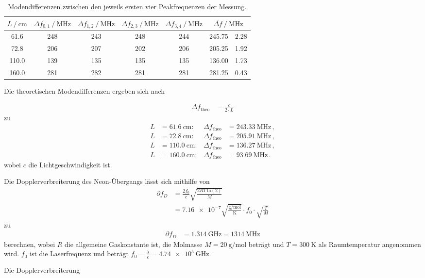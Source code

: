 \begin{table}[H]
  \centering
  \caption{Modendifferenzen zwischen den jeweils ersten vier Peakfrequenzen der Messung.}
  \label{tab:Modendifferenzen}
  \begin{tabular}{S[table-format=2.1] S S S S S@{${}\pm{}$} S[table-format=3.2]}
    \toprule
    {$L \mathbin{/} \si{\centi\meter}$} &{$\Delta f_{0,1} \mathbin{/} \si{\mega\hertz}$} &
    {$\Delta f_{1,2} \mathbin{/} \si{\mega\hertz}$} &{$\Delta f_{2,3} \mathbin{/} \si{\mega\hertz}$} &
    {$\Delta f_{3,4} \mathbin{/} \si{\mega\hertz}$} & \\
      & 248 & 243 & 248 & 244 & 245.75 & 2.28\\
       72.8  & 206 & 207 & 202 & 206 & 205.25 & 1.92\\
      110.0  & 139 & 135 & 135 & 135 & 136.00 & 1.73\\
      160.0  & 281 & 282 & 281 & 281 & 281.25 & 0.43\\
    \bottomrule
  \end{tabular}
\end{table}

Die theoretischen Modendifferenzen ergeben sich nach

\begin{align*}
  \Delta f_{\text{theo}} &= \frac{c}{2 \cdot L}
\end{align*}
zu 
\begin{align*}
  L &= \SI{ 61.6}{\centi\meter}: & \Delta f_\text{theo} &= \SI{243.33}{\mega\hertz}\, , \\  
  L &= \SI{ 72.8}{\centi\meter}: & \Delta f_\text{theo} &= \SI{205.91}{\mega\hertz}\, , \\  
  L &= \SI{110.0}{\centi\meter}: & \Delta f_\text{theo} &= \SI{136.27}{\mega\hertz}\, , \\
  L &= \SI{160.0}{\centi\meter}: & \Delta f_\text{theo} &= \SI{93.69}{\mega\hertz}\, . 
\end{align*}
wobei $c$ die Lichtgeschwindigkeit ist.

Die Dopplerverbreiterung des Neon-Übergangs lässt sich mithilfe von 
\begin{align*}
  \partial f_D &= \frac{2f_0}{c} \sqrt{\frac{2RT\: \text{ln}(2)}{M}} \\
  &= \num{7.16e-7}\sqrt{\frac{\si{\gram\per\mol}}{\si{\kelvin}}} \cdot f_0 \cdot \sqrt{\frac{T}{M}}
\end{align*}
zu 
\begin{align*}
  \partial f_D &= \SI{1.314}{\giga\hertz} = \SI{1314}{\mega\hertz}
\end{align*}
berechnen, wobei $R$ die allgemeine Gaskonstante ist, die Molmasse
$M = \SI{20}{\gram\per\mol}$ beträgt und $T=\qty{300}{\kelvin}$ als Raumtemperatur angenommen wird.
$f_0$ ist die Laserfrequenz und beträgt $f_0= \frac{\lambda}{c} = \SI{4.74e5}{\giga\hertz}$.

Die Dopplerverbreiterung


